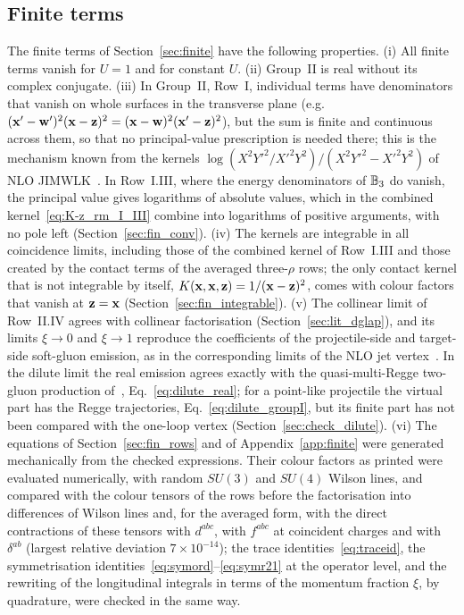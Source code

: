 \subsection{Finite terms}\label{sec:lit_finite}

The finite terms of Section~\ref{sec:finite} have the following properties. (i) All finite terms vanish for $U=1$ and for constant $U$. (ii) Group~II is real without its complex conjugate. (iii) In Group~II, Row~I, individual terms have denominators that vanish on whole surfaces in the transverse plane (e.g.\ $(\mathbf{x}'-\mathbf{w}')^2(\mathbf{x}-\mathbf{z})^2=(\mathbf{x}-\mathbf{w})^2(\mathbf{x}'-\mathbf{z})^2$), but the sum is finite and continuous across them, so that no principal-value prescription is needed there; this is the mechanism known from the kernels $\log(X^2Y'^2/X'^2Y^2)/(X^2Y'^2-X'^2Y^2)$ of NLO JIMWLK~\cite{Balitsky:2013fea,Kovner:2013ona}. In Row~I.III, where the energy denominators of $\mathbb{B}_3$ do vanish, the principal value gives logarithms of absolute values, which in the combined kernel~\eqref{eq:K-z_rm_I_III} combine into logarithms of positive arguments, with no pole left (Section~\ref{sec:fin_conv}). (iv) The kernels are integrable in all coincidence limits, including those of the combined kernel of Row~I.III and those created by the contact terms of the averaged three-$\rho$ rows; the only contact kernel that is not integrable by itself, $K(\mathbf{x},\mathbf{x},\mathbf{z})=1/(\mathbf{x}-\mathbf{z})^2$, comes with colour factors that vanish at $\mathbf{z}=\mathbf{x}$ (Section~\ref{sec:fin_integrable}). (v) The collinear limit of Row~II.IV agrees with collinear factorisation (Section~\ref{sec:lit_dglap}), and its limits $\xi\to0$ and $\xi\to1$ reproduce the coefficients of the projectile-side and target-side soft-gluon emission, as in the corresponding limits of the NLO jet vertex~\cite{Bartels:2006hg}. In the dilute limit the real emission agrees exactly with the quasi-multi-Regge two-gluon production of~\cite{Fadin:1998py,Bartels:2006hg}, Eq.~\eqref{eq:dilute_real}; for a point-like projectile the virtual part has the Regge trajectories, Eq.~\eqref{eq:dilute_groupI}, but its finite part has not been compared with the one-loop vertex (Section~\ref{sec:check_dilute}). (vi) The equations of Section~\ref{sec:fin_rows} and of Appendix~\ref{app:finite} were generated mechanically from the checked expressions. Their colour factors as printed were evaluated numerically, with random $SU(3)$ and $SU(4)$ Wilson lines, and compared with the colour tensors of the rows before the factorisation into differences of Wilson lines and, for the averaged form, with the direct contractions of these tensors with $d^{abc}$, with $f^{abc}$ at coincident charges and with $\delta^{ab}$ (largest relative deviation $7\times10^{-14}$); the trace identities~\eqref{eq:traceid}, the symmetrisation identities~\eqref{eq:symord}--\eqref{eq:symr21} at the operator level, and the rewriting of the longitudinal integrals in terms of the momentum fraction $\xi$, by quadrature, were checked in the same way.

